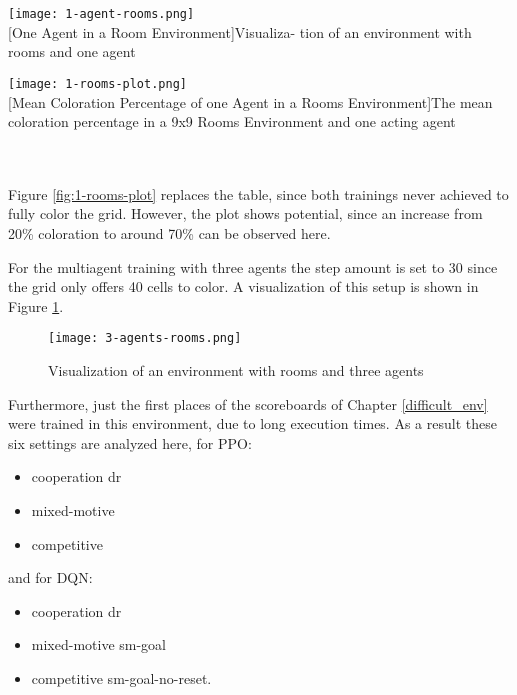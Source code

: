 \begin{minipage}{\textwidth}
  \begin{minipage}[b]{0.29\textwidth}
    \centering
    \texttt{[image: 1-agent-rooms.png]}\\
    [One Agent in a Room Environment]{Visualiza- tion of an environment with rooms and one agent}\label{fig:1-agent-rooms}
  \end{minipage}
  \hfill
  \begin{minipage}[b]{0.69\textwidth}
    \centering
    \texttt{[image: 1-rooms-plot.png]}\\
    [Mean Coloration Percentage of one Agent in a Rooms Environment]{The mean coloration percentage in a 9x9 Rooms Environment and one acting agent \\}\label{fig:1-rooms-plot}
    \end{minipage}
  \end{minipage}\\\\

Figure \ref{fig:1-rooms-plot} replaces the table, since both trainings never achieved to fully color the grid. However, the plot shows potential, since an increase from 20\% coloration to around 70\% can be observed here.

For the multiagent training with three agents the step amount is set to 30 since the grid only offers 40 cells to color. A visualization of this setup is shown in Figure \ref{fig:3-agents-rooms}.

\begin{figure}[hpbt]
    \centering
    \texttt{[image: 3-agents-rooms.png]}\\
    \caption[Three Agents in a Room Environment]{Visualization of an environment with rooms and three agents}\label{fig:3-agents-rooms}
\end{figure}

Furthermore, just the first places of the scoreboards of Chapter \ref{difficult_env} were trained in this environment, due to long execution times. As a result these six settings are analyzed here, for PPO:
\begin{itemize}
    \item cooperation dr
    \item mixed-motive
    \item competitive
\end{itemize}
    and for DQN:
\begin{itemize}
    \item cooperation dr
    \item mixed-motive sm-goal
    \item competitive sm-goal-no-reset.
\end{itemize}

